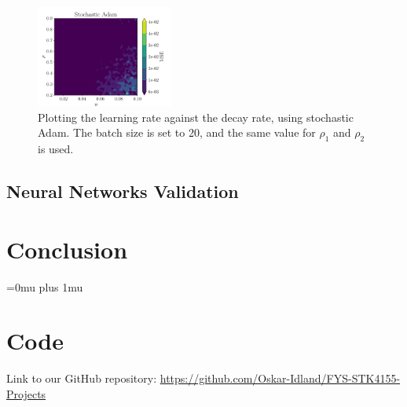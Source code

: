 \documentclass[aps,pra,english,notitlepage,reprint,nofootinbib]{revtex4-1}  %
\begin{document}
\begin{figure}[ht!]
    \centering
    \includegraphics[width = 0.4\textwidth]{../figs/Adam_stochastic_eta_rho.pdf}
    \caption{Plotting the learning rate against the decay rate, using stochastic Adam. The batch size is set to 20, and the same value for $ρ_1$ and $ρ_2$ is used.}
    \label{fig: Adam_stochastic_eta_rho.pdf}
\end{figure}

\subsection{Neural Networks Validation}

\section{Conclusion}\label{sec:conclusion}


\Urlmuskip=0mu plus 1mu\relax
\onecolumngrid


\newpage
\appendix
\section{Code}\label{appsec:code}
Link to our GitHub repository: \href{https://github.com/Oskar-Idland/FYS-STK4155-Projects}{https://github.com/Oskar-Idland/FYS-STK4155-Projects}
\end{document}
